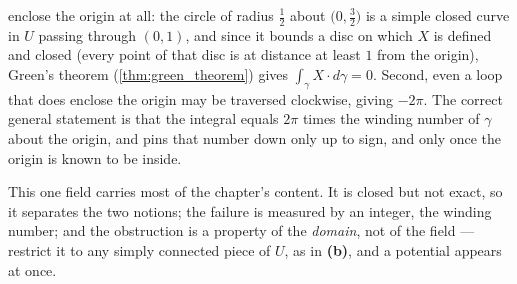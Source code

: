 \begin{exercisesolution}
\begin{enumerate}[label=\textbf{(\alph*)}]
    enclose the origin at all: the circle of radius $\tfrac12$ about $\big(0,\tfrac32\big)$ is a
    simple closed curve in $U$ passing through $(0,1)$, and since it bounds a disc on which $X$
    is defined and closed (every point of that disc is at distance at least $1$ from the
    origin), Green's
    theorem (\cref{thm:green_theorem}) gives $\int_\gamma X \cdot d\gamma = 0$. Second, even a loop
    that does enclose the origin may be traversed clockwise, giving $-2\pi$. The correct general
    statement is that the integral equals $2\pi$ times the winding number of $\gamma$ about the
    origin, and  pins that number down only up to sign, and only once the
    origin is known to be inside.
\end{enumerate}
\begin{remark}
This one field carries most of the chapter's content. It is closed but not exact, so it separates the
two notions; the failure is measured by an integer, the winding number; and the obstruction is a
property of the \emph{domain}, not of the field --- restrict it to any simply connected piece of $U$,
as in \textbf{(b)}, and a potential appears at once.
\end{remark}
\end{exercisesolution}

